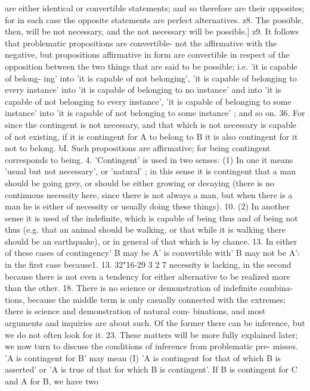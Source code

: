{{{{are either identical or convertible statements; and so therefore
are their opposites; for in each case the opposite statements are
perfect alternatives.
z8. The possible, then, will be not necessary, and the not
necessary will be possible.]
z9. It follows that problematic propositions are convertible-
not the affirmative with the negative, but propositions affirmative
in form are convertible in respect of the opposition between the
two things that are said to be possible; i.e. 'it is capable of belong-
ing' into 'it is capable of not belonging', 'it is capable of belonging
to every instance' into 'it is capable of belonging to no instance'
and into 'it is capable of not belonging to every instance', 'it is
capable of belonging to some instance' into 'it is capable of not
belonging to some instance' ; and so on.
36. For since the contingent is not necessary, and that which is
not necessary is capable of not existing, if it is contingent for A to
belong to B it is also contingent for it not to belong.
bI. Such propositions are affirmative; for being contingent
corresponds to being.
4. 'Contingent' is used in two senses: (1) In one it means 'usual
but not necessary', or 'natural' ; in this sense it is contingent that
a man should be going grey, or should be either growing or
decaying (there is no continuous necessity here, since there is not
always a man, but when there is a man he is either of necessity
or usually doing these things).
10. (2) In another sense it is used of the indefinite, which is
capable of being thus and of being not thus (e.g. that an animal
should be walking, or that while it is walking there should be an
earthquake), or in general of that which is by chance.
13. In either of these cases of contingency' B may be A' is
convertible with' B may not be A': in the first case because1. 13. 32"16-29
3 2 7
necessity is lacking, in the second because there is not even a
tendency for either alternative to be realized more than the other.
18. There is no science or demonstration of indefinite combina-
tions, because the middle term is only casually connected with
the extremes; there is science and demonstration of natural com-
binations, and most arguments and inquiries are about such.
Of the former there can be inference, but we do not often look
for it.
23. These matters will be more fully explained later; we now
turn to discuss the conditions of inference from problematic pre-
misses. 'A is contingent for B' may mean (I) 'A is contingent for
that of which B is asserted' or 'A is true of that for which B is
contingent'. If B is contingent for C and A for B, we have two
}}}}
